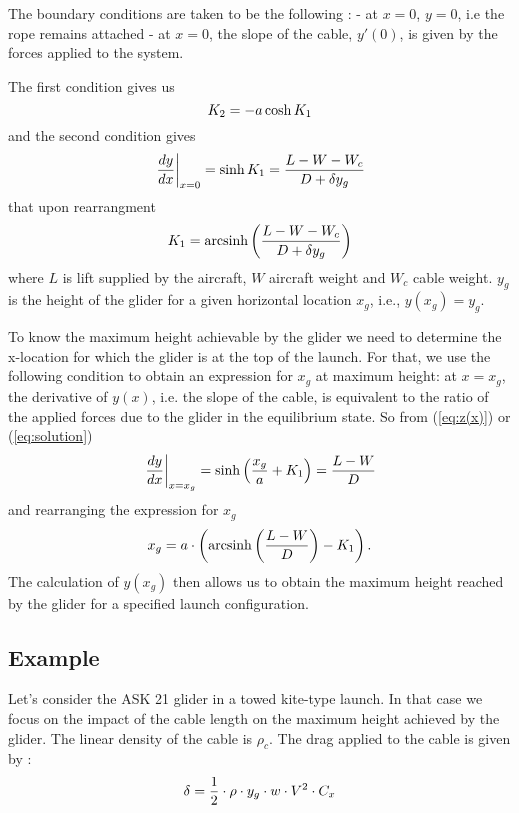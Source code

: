 \documentclass[11pt]{amsart}
\DeclareMathOperator{\arcsinh}{arcsinh}
\begin{document}
The boundary conditions are taken to be the following :\newline
- at $x=0$, $y=0$, i.e the rope remains attached \newline
- at $x=0$, the slope of the cable, $y\prime(0)$, is given by the forces applied to the system.

The first condition gives us
\begin{equation}
	\centering
	K_2 =-a \cosh{K_1}
	\label{eq:K2}
\end{equation}
and the second condition gives
\begin{equation}
	\centering
	\left. \frac{dy}{dx}\right|_{x=0} = \sinh{K_1} = \frac{L-W-W_c}{D + \delta y_g}
	\label{eq:bc1}
\end{equation}
that upon rearrangment
\begin{equation}
	\centering
	K_1 = \arcsinh \left(\frac{L-W-W_c}{D + \delta y_g}\right)
	\label{eq:K1}
\end{equation}
where $L$ is lift supplied by the aircraft, $W$ aircraft weight and $W_c$ cable weight. $y_g$ is the height of the glider for a given horizontal location $x_g$, i.e., $y(x_g)=y_g$. 

To know the maximum height achievable by the glider we need to determine the x-location for which the glider is at the top of the launch. For that, we use the following condition to obtain an expression for $x_g$ at maximum height: at $x=x_g$, the derivative of $y(x)$, i.e. the slope of the cable, is equivalent to the ratio of the applied forces due to the glider in the equilibrium state. So from (\ref{eq:z(x)}) or (\ref{eq:solution})
\begin{equation}
	\centering
	\left. \frac{dy}{dx}\right|_{x=x_g}=\sinh\left(\frac{x_g}{a} + K_1 \right) = \frac{L-W}{D}
	\label{eq:bc2}
\end{equation}
and rearranging the expression for $x_g$ 
\begin{equation}
	\centering
	 x_g=a \cdot \left( \arcsinh \left(\frac{L-W}{D}\right) - K_1 \right).
	\label{eq:x_g}
\end{equation}
The calculation of $y(x_g)$ then allows us to obtain the maximum height reached by the glider for a specified launch configuration.


\subsection{Example}

Let's consider the ASK 21 glider in a towed kite-type launch. In that case we focus on the impact of the cable length on the maximum height achieved by the glider. The linear density of the cable is $\rho_c$. The drag applied to the cable is given by : 
\begin{equation}
	\centering
	\delta=\frac{1}{2}\cdot \rho \cdot y_g \cdot w \cdot V^2 \cdot C_x
	\label{eq:delta}
\end{equation}
\end{document}
